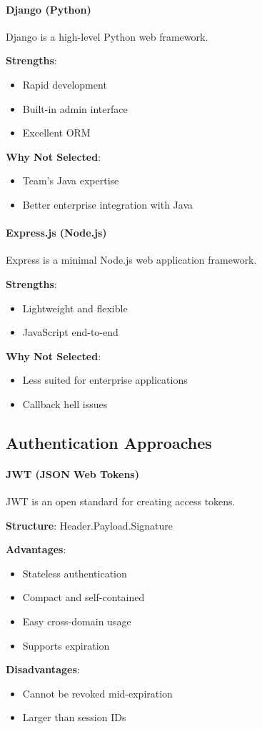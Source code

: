 \documentclass[12pt,a4paper,twoside]{book}
\newcommand{\subsubsubsection}[1]{\paragraph{#1}}
\begin{document}
\subsubsubsection{Django (Python)}
Django is a high-level Python web framework.

\textbf{Strengths}:
\begin{itemize}
    \item Rapid development
    \item Built-in admin interface
    \item Excellent ORM
\end{itemize}

\textbf{Why Not Selected}:
\begin{itemize}
    \item Team's Java expertise
    \item Better enterprise integration with Java
\end{itemize}

\subsubsubsection{Express.js (Node.js)}
Express is a minimal Node.js web application framework.

\textbf{Strengths}:
\begin{itemize}
    \item Lightweight and flexible
    \item JavaScript end-to-end
\end{itemize}

\textbf{Why Not Selected}:
\begin{itemize}
    \item Less suited for enterprise applications
    \item Callback hell issues
\end{itemize}

\subsection{Authentication Approaches}

\subsubsubsection{JWT (JSON Web Tokens)}
JWT is an open standard for creating access tokens.

\textbf{Structure}: Header.Payload.Signature

\textbf{Advantages}:
\begin{itemize}
    \item Stateless authentication
    \item Compact and self-contained
    \item Easy cross-domain usage
    \item Supports expiration
\end{itemize}

\textbf{Disadvantages}:
\begin{itemize}
    \item Cannot be revoked mid-expiration
    \item Larger than session IDs
\end{itemize}
\end{document}
